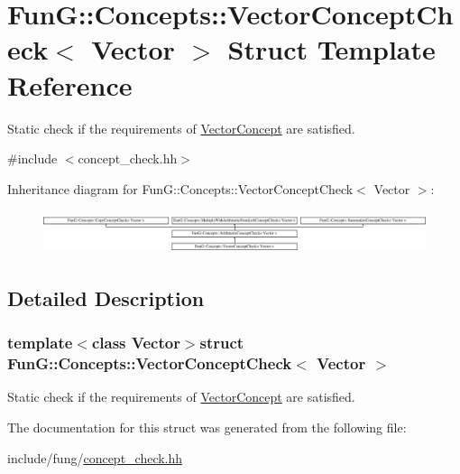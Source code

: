 \hypertarget{structFunG_1_1Concepts_1_1VectorConceptCheck}{\section{Fun\-G\-:\-:Concepts\-:\-:Vector\-Concept\-Check$<$ Vector $>$ Struct Template Reference}
\label{structFunG_1_1Concepts_1_1VectorConceptCheck}
}


Static check if the requirements of \hyperlink{structFunG_1_1Concepts_1_1VectorConcept}{Vector\-Concept} are satisfied.  




{\ttfamily \#include $<$concept\-\_\-check.\-hh$>$}

Inheritance diagram for Fun\-G\-:\-:Concepts\-:\-:Vector\-Concept\-Check$<$ Vector $>$\-:\begin{figure}[H]
\begin{center}
\leavevmode
\includegraphics[height=1.287356cm]{structFunG_1_1Concepts_1_1VectorConceptCheck}
\end{center}
\end{figure}


\subsection{Detailed Description}
\subsubsection*{template$<$class Vector$>$struct Fun\-G\-::\-Concepts\-::\-Vector\-Concept\-Check$<$ Vector $>$}

Static check if the requirements of \hyperlink{structFunG_1_1Concepts_1_1VectorConcept}{Vector\-Concept} are satisfied. 

The documentation for this struct was generated from the following file\-:\begin{DoxyCompactItemize}
\item 
include/fung/\hyperlink{concept__check_8hh}{concept\-\_\-check.\-hh}\end{DoxyCompactItemize}
